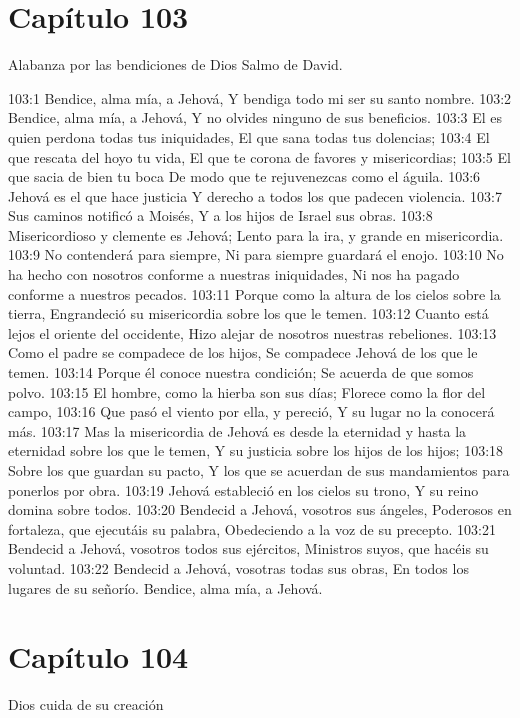 \section*{Capítulo 103}
Alabanza por las bendiciones de Dios 
Salmo de David. 
 
103:1 Bendice, alma mía, a Jehová, 
Y bendiga todo mi ser su santo nombre. 
103:2 Bendice, alma mía, a Jehová, 
Y no olvides ninguno de sus beneficios. 
103:3 El es quien perdona todas tus iniquidades, 
El que sana todas tus dolencias; 
103:4 El que rescata del hoyo tu vida, 
El que te corona de favores y misericordias; 
103:5 El que sacia de bien tu boca 
De modo que te rejuvenezcas como el águila. 
103:6 Jehová es el que hace justicia 
Y derecho a todos los que padecen violencia. 
103:7 Sus caminos notificó a Moisés, 
Y a los hijos de Israel sus obras. 
103:8 Misericordioso y clemente es Jehová; 
Lento para la ira, y grande en misericordia. 
103:9 No contenderá para siempre, 
Ni para siempre guardará el enojo. 
103:10 No ha hecho con nosotros conforme a nuestras iniquidades, 
Ni nos ha pagado conforme a nuestros pecados. 
103:11 Porque como la altura de los cielos sobre la tierra, 
Engrandeció su misericordia sobre los que le temen. 
103:12 Cuanto está lejos el oriente del occidente, 
Hizo alejar de nosotros nuestras rebeliones. 
103:13 Como el padre se compadece de los hijos, 
Se compadece Jehová de los que le temen. 
103:14 Porque él conoce nuestra condición; 
Se acuerda de que somos polvo. 
103:15 El hombre, como la hierba son sus días; 
Florece como la flor del campo, 
103:16 Que pasó el viento por ella, y pereció, 
Y su lugar no la conocerá más. 
103:17 Mas la misericordia de Jehová es desde la eternidad y hasta la eternidad sobre los que le temen, 
Y su justicia sobre los hijos de los hijos; 
103:18 Sobre los que guardan su pacto, 
Y los que se acuerdan de sus mandamientos para ponerlos por obra. 
103:19 Jehová estableció en los cielos su trono, 
Y su reino domina sobre todos. 
103:20 Bendecid a Jehová, vosotros sus ángeles, 
Poderosos en fortaleza, que ejecutáis su palabra, 
Obedeciendo a la voz de su precepto. 
103:21 Bendecid a Jehová, vosotros todos sus ejércitos, 
Ministros suyos, que hacéis su voluntad. 
103:22 Bendecid a Jehová, vosotras todas sus obras, 
En todos los lugares de su señorío. 
Bendice, alma mía, a Jehová. 
\section*{Capítulo 104}
Dios cuida de su creación 
 
